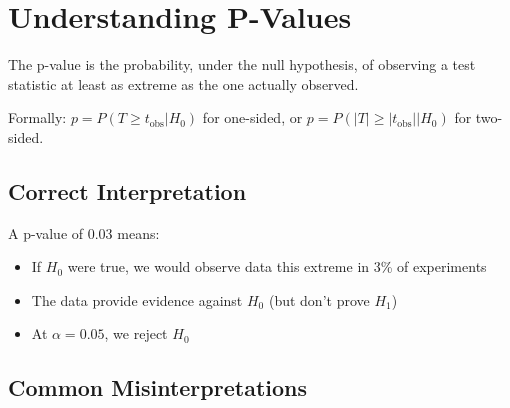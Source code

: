 \section{Understanding P-Values}

\begin{definition}[P-Value]
The p-value is the probability, under the null hypothesis, of observing a test statistic at least as extreme as the one actually observed.

Formally: $p = P(T \geq t_{\text{obs}} | H_0)$ for one-sided, or $p = P(|T| \geq |t_{\text{obs}}| | H_0)$ for two-sided.
\end{definition}

\subsection{Correct Interpretation}

A p-value of 0.03 means:
\begin{itemize}
    \item \checkmark If $H_0$ were true, we would observe data this extreme in 3\% of experiments
    \item \checkmark The data provide evidence against $H_0$ (but don't prove $H_1$)
    \item \checkmark At $\alpha = 0.05$, we reject $H_0$
\end{itemize}

\subsection{Common Misinterpretations}

